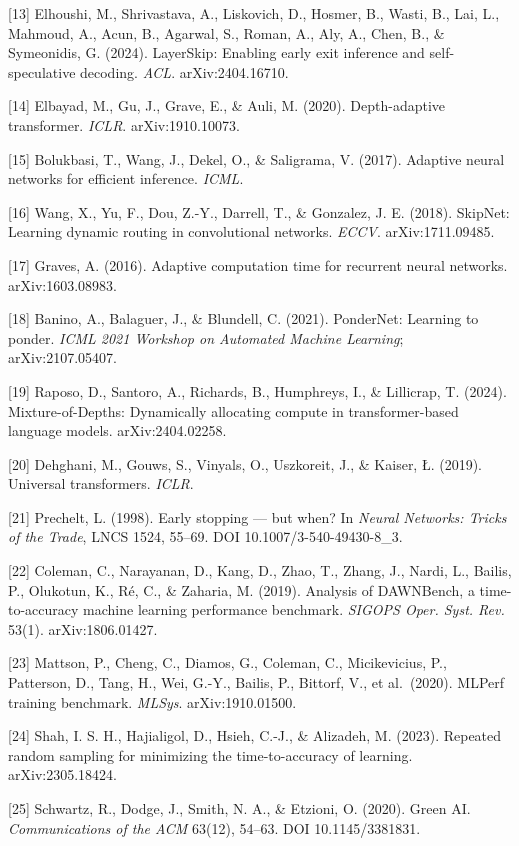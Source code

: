 \documentclass[
]{article}
\begin{document}
{[}13{]} Elhoushi, M., Shrivastava, A., Liskovich, D., Hosmer, B.,
Wasti, B., Lai, L., Mahmoud, A., Acun, B., Agarwal, S., Roman, A., Aly,
A., Chen, B., \& Symeonidis, G. (2024). LayerSkip: Enabling early exit
inference and self-speculative decoding. \emph{ACL}. arXiv:2404.16710.

{[}14{]} Elbayad, M., Gu, J., Grave, E., \& Auli, M. (2020).
Depth-adaptive transformer. \emph{ICLR}. arXiv:1910.10073.

{[}15{]} Bolukbasi, T., Wang, J., Dekel, O., \& Saligrama, V. (2017).
Adaptive neural networks for efficient inference. \emph{ICML}.

{[}16{]} Wang, X., Yu, F., Dou, Z.-Y., Darrell, T., \& Gonzalez, J. E.
(2018). SkipNet: Learning dynamic routing in convolutional networks.
\emph{ECCV}. arXiv:1711.09485.

{[}17{]} Graves, A. (2016). Adaptive computation time for recurrent
neural networks. arXiv:1603.08983.

{[}18{]} Banino, A., Balaguer, J., \& Blundell, C. (2021). PonderNet:
Learning to ponder. \emph{ICML 2021 Workshop on Automated Machine
Learning}; arXiv:2107.05407.

{[}19{]} Raposo, D., Santoro, A., Richards, B., Humphreys, I., \&
Lillicrap, T. (2024). Mixture-of-Depths: Dynamically allocating compute
in transformer-based language models. arXiv:2404.02258.

{[}20{]} Dehghani, M., Gouws, S., Vinyals, O., Uszkoreit, J., \& Kaiser,
Ł. (2019). Universal transformers. \emph{ICLR}.

{[}21{]} Prechelt, L. (1998). Early stopping --- but when? In
\emph{Neural Networks: Tricks of the Trade}, LNCS 1524, 55--69. DOI
10.1007/3-540-49430-8\_3.

{[}22{]} Coleman, C., Narayanan, D., Kang, D., Zhao, T., Zhang, J.,
Nardi, L., Bailis, P., Olukotun, K., Ré, C., \& Zaharia, M. (2019).
Analysis of DAWNBench, a time-to-accuracy machine learning performance
benchmark. \emph{SIGOPS Oper. Syst. Rev.} 53(1). arXiv:1806.01427.

{[}23{]} Mattson, P., Cheng, C., Diamos, G., Coleman, C., Micikevicius,
P., Patterson, D., Tang, H., Wei, G.-Y., Bailis, P., Bittorf, V., et
al.~(2020). MLPerf training benchmark. \emph{MLSys}. arXiv:1910.01500.

{[}24{]} Shah, I. S. H., Hajialigol, D., Hsieh, C.-J., \& Alizadeh, M.
(2023). Repeated random sampling for minimizing the time-to-accuracy of
learning. arXiv:2305.18424.

{[}25{]} Schwartz, R., Dodge, J., Smith, N. A., \& Etzioni, O. (2020).
Green AI. \emph{Communications of the ACM} 63(12), 54--63. DOI
10.1145/3381831.
\end{document}
